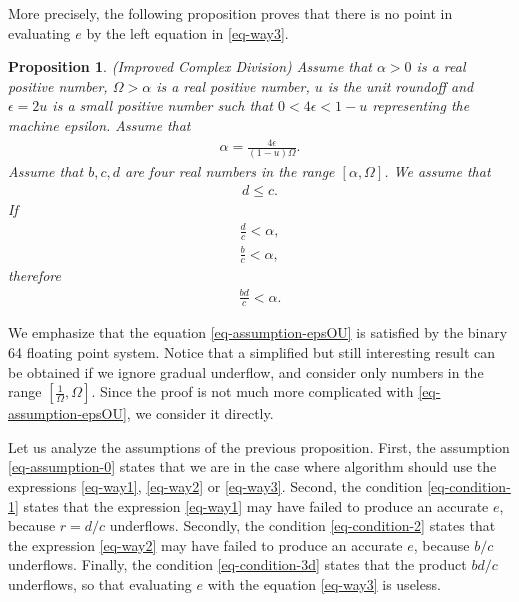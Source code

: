 \documentclass{paper}
\newtheorem{proposition}[theorem]{Proposition}
\begin{document}
More precisely, the following proposition proves that there is no point 
in evaluating $e$ by the left equation in \ref{eq-way3}.

\begin{proposition}
(\emph{Improved Complex Division})
\label{prop-impcompdiv}
Assume that $\alpha>0$ is a real positive number, $\Omega>\alpha$ is a real positive number, 
$u$ is the unit roundoff and $\epsilon=2u$ is a small positive number such 
that $0<4\epsilon<1-u$ representing the machine epsilon. 
Assume that 
\begin{eqnarray}
\label{eq-assumption-epsOU}
\alpha = \frac{4\epsilon}{(1-u)\Omega}.
\end{eqnarray}
Assume that $b,c,d$ are four real numbers in the range $[\alpha,\Omega]$. 
We assume that 
\begin{eqnarray}
\label{eq-assumption-0}
            d \leq c.
\end{eqnarray}
If 
\begin{eqnarray}
\label{eq-condition-1}
            \frac{d}{c} < \alpha, \\
\label{eq-condition-2}
            \frac{b}{c} < \alpha, 
\end{eqnarray}
therefore
\begin{eqnarray}
\label{eq-condition-3d}
            \frac{bd}{c} < \alpha.
\end{eqnarray}
\end{proposition}

We emphasize that the equation \ref{eq-assumption-epsOU} is 
satisfied by the binary 64 floating point system. 
Notice that a simplified but still interesting result can be obtained if 
we ignore gradual underflow, and consider only numbers in the 
range $[\frac{1}{\Omega},\Omega]$.
Since the proof is not much more complicated 
with \ref{eq-assumption-epsOU}, we consider it directly.

Let us analyze the assumptions of the previous proposition. 
First, the assumption \ref{eq-assumption-0} states that we are in the 
case where algorithm should use the expressions \ref{eq-way1}, 
\ref{eq-way2} or \ref{eq-way3}. 
Second, the condition \ref{eq-condition-1} states that the expression 
\ref{eq-way1} may have failed to produce an accurate 
$e$, because $r=d/c$ underflows. 
Secondly, the condition \ref{eq-condition-2} states that the expression 
\ref{eq-way2} may have failed to produce an accurate 
$e$, because $b/c$ underflows.
Finally, the condition \ref{eq-condition-3d} states that the 
product $bd/c$ underflows, so that evaluating $e$ with the equation 
\ref{eq-way3} is useless. 
\end{document}
